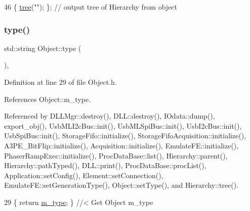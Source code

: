 \begin{DoxyCode}
46 \{ \hyperlink{classHierarchy_a594c294c5f60c230e106d522ed008212}{tree}(\textcolor{stringliteral}{""}); \};                     \textcolor{comment}{// output tree of Hierarchy from object}
\end{DoxyCode}
\mbox{\label{classObject_a84f99f70f144a83e1582d1d0f84e4e62}} 
\subsubsection{\texorpdfstring{type()}{type()}}
{\footnotesize\ttfamily std\+::string Object\+::type (\begin{DoxyParamCaption}{ }\end{DoxyParamCaption})\hspace{0.3cm}{\ttfamily [inline]}, {\ttfamily [inherited]}}



Definition at line 29 of file Object.\+h.



References Object\+::m\+\_\+type.



Referenced by D\+L\+L\+Mgr\+::destroy(), D\+L\+L\+::destroy(), I\+Odata\+::dump(), export\+\_\+obj(), Usb\+M\+L\+I2c\+Bus\+::init(), Usb\+M\+L\+Spi\+Bus\+::init(), Usb\+I2c\+Bus\+::init(), Usb\+Spi\+Bus\+::init(), Storage\+Fifo\+::initialize(), Storage\+Fifo\+Acquisition\+::initialize(), A3\+P\+E\+\_\+\+Bit\+Flip\+::initialize(), Acquisition\+::initialize(), Emulate\+F\+E\+::initialize(), Phaser\+Ramp\+Exec\+::initialize(), Proc\+Data\+Base\+::list(), Hierarchy\+::parent(), Hierarchy\+::path\+Typed(), D\+L\+L\+::print(), Proc\+Data\+Base\+::proc\+List(), Application\+::set\+Config(), Element\+::set\+Connection(), Emulate\+F\+E\+::set\+Generation\+Type(), Object\+::set\+Type(), and Hierarchy\+::tree().


\begin{DoxyCode}
29 \{ \textcolor{keywordflow}{return} \hyperlink{classObject_a457a600fe8c00eb1034374f75110a78c}{m\_type};       \} \textcolor{comment}{//< Get Object m\_type}
\end{DoxyCode}
\mbox{\label{classSpecsInterface_af17ca5c8d48bea81f84e503b2994f5da}} 
